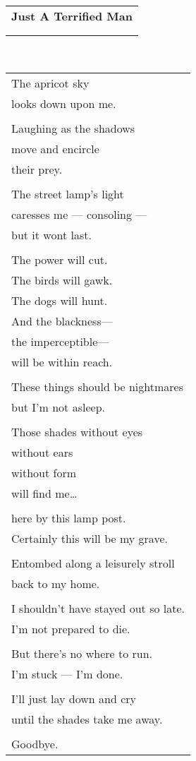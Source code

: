 \documentclass{article}
\begin{document}
\newcommand{\h}{\hspace*{2ex}}
\newcommand{\HHHH}{\hspace*{32ex}}

\begin{center}
\begin{tabular}{ll}
\multicolumn{2}{c}{\large\textbf{Just A Terrified Man}} \\
&\\\hline
&\\
\end{tabular} \\
\begin{tabular}{l}
The apricot sky \\
looks down upon me. \\
\\
Laughing as the shadows \\
move and encircle \\
their prey. \\
\\
The street lamp's light \\
caresses me --- consoling --- \\
but it wont last. \\
\\
The power will cut. \\
The birds will gawk. \\
The dogs will hunt. \\
And the blackness--- \\
the imperceptible--- \\
will be within reach. \\
\\
These things should be nightmares \\
but I'm not asleep. \\
\\
Those shades without eyes \\
without ears \\
without form \\
will find me\ldots{} \\
\\
here by this lamp post. \\
Certainly this will be my grave. \\
\\
Entombed along a leisurely stroll \\
back to my home. \\
\\
I shouldn't have stayed out so late. \\
I'm not prepared to die. \\
\\
But there's no where to run. \\
I'm stuck --- I'm done. \\
\\
I'll just lay down and cry \\
until the shades take me away. \\
\\
Goodbye. \\
\end{tabular}
\end{center}
\end{document}
